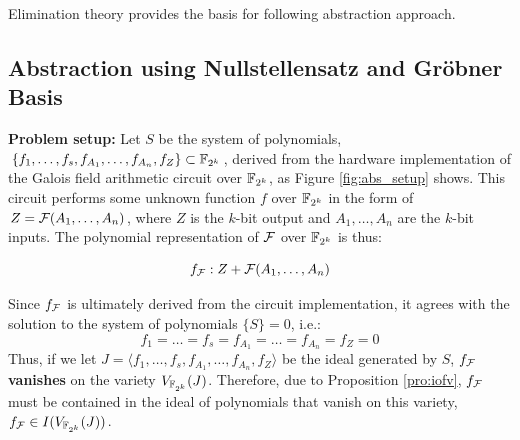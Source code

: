 Elimination theory provides the basis for following abstraction approach.
\subsection{Abstraction using Nullstellensatz and Gr\"obner Basis}
\begin{figure}[H]
\end{figure}

{\bf Problem setup:} Let $S$ be the system of polynomials, 
$\{f_1,\dots,f_s,f_{A_1},\dots,f_{A_n},f_{Z}\}\subset {\mathbb{F}}_{2^k}$, 
derived from the hardware
implementation of the Galois field arithmetic circuit over ${\mathbb{F}}_{2^k}$, as Figure \ref{fig:abs_setup} shows.
This circuit performs some unknown function $f$ over 
${\mathbb{F}}_{2^k}$ in the form of $Z={\mathcal{F}}(A_1,\dots,A_n)$, where $Z$ is the $k$-bit 
output and $A_1,\dots,A_n$ are the $k$-bit inputs.
The polynomial representation of ${\mathcal{F}}$ over ${\mathbb{F}}_{2^k}$ is thus:

\begin{equation}
f_{{\mathcal{F}}}: Z+{\mathcal{F}}(A_1,\dots,A_n) \nonumber
\end{equation}

Since $f_{{\mathcal{F}}}$ is ultimately derived from the circuit implementation, 
it agrees with the solution to the system of polynomials $\{S\}=0$, i.e.:
\begin{equation}
f_1=\dots=f_s=f_{A_1}=\dots=f_{A_n}=f_{Z}=0 \nonumber
\end{equation}
Thus, if we let $J=\langle f_1,\dots,f_s,f_{A_1},\dots,f_{A_n},f_{Z}\rangle$ 
be the ideal generated by $S$, 
$f_{{\mathcal{F}}}$ {\bf vanishes} on the variety $V_{{\mathbb{F}}_{2^k}}(J)$. 
Therefore, due to Proposition \ref{pro:iofv}, 
$f_{{\mathcal{F}}}$ must be contained in the ideal of polynomials that vanish on
this variety, $f_{{\mathcal{F}}} \in I(V_{{\mathbb{F}}_{2^k}}(J))$. 

